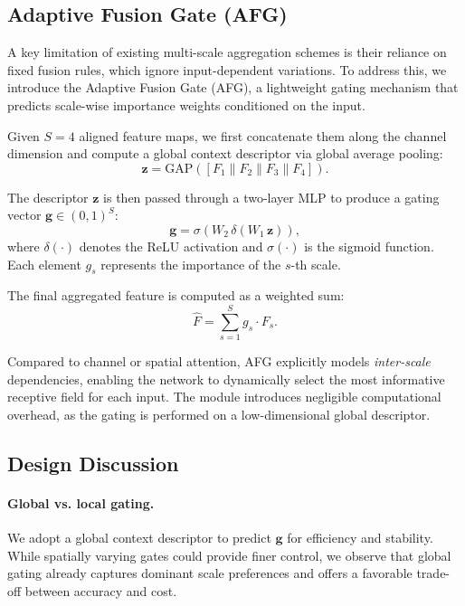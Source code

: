 \documentclass[11pt]{article}
\begin{document}
\subsection{Adaptive Fusion Gate (AFG)}

A key limitation of existing multi-scale aggregation schemes is their reliance
on fixed fusion rules, which ignore input-dependent variations. To address this,
we introduce the Adaptive Fusion Gate (AFG), a lightweight gating mechanism that
predicts scale-wise importance weights conditioned on the input.

Given $S=4$ aligned feature maps, we first concatenate them along the channel
dimension and compute a global context descriptor via global average pooling:
\begin{equation}
\mathbf{z} = \mathrm{GAP}\!\left(\left[F_1 \| F_2 \| F_3 \| F_4\right]\right).
\end{equation}

The descriptor $\mathbf{z}$ is then passed through a two-layer MLP to produce
a gating vector $\mathbf{g} \in (0,1)^S$:
\begin{equation}
\mathbf{g} = \sigma\!\left(W_2\,\delta\!\left(W_1\,\mathbf{z}\right)\right),
\end{equation}
where $\delta(\cdot)$ denotes the ReLU activation and $\sigma(\cdot)$ is the
sigmoid function. Each element $g_s$ represents the importance of the $s$-th
scale.

The final aggregated feature is computed as a weighted sum:
\begin{equation}
\hat{F} = \sum_{s=1}^{S} g_s \cdot F_s.
\end{equation}

Compared to channel or spatial attention, AFG explicitly models \emph{inter-scale}
dependencies, enabling the network to dynamically select the most informative
receptive field for each input. The module introduces negligible computational
overhead, as the gating is performed on a low-dimensional global descriptor.

\subsection{Design Discussion}

\paragraph{Global vs. local gating.}
We adopt a global context descriptor to predict $\mathbf{g}$ for efficiency and
stability. While spatially varying gates could provide finer control, we observe
that global gating already captures dominant scale preferences and offers a
favorable trade-off between accuracy and cost.
\end{document}
